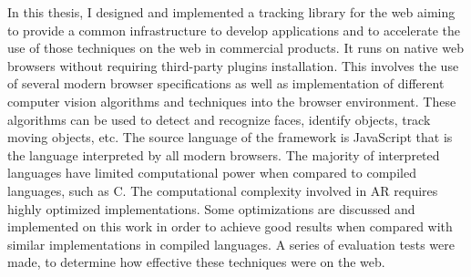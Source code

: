 In this thesis, I designed and implemented a tracking library for the web aiming to provide a common infrastructure to develop applications and to accelerate the use of those techniques on the web in commercial products.  It runs on native web browsers without requiring third-party plugins installation. This involves the use of several modern browser specifications as well as implementation of different computer vision algorithms and techniques into the browser environment. These algorithms can be used to detect and recognize faces, identify objects, track moving objects, etc.  The source language of the framework is JavaScript that is the language interpreted by all modern browsers. The majority of interpreted languages have limited computational power when compared to compiled languages, such as C. The computational complexity involved in AR requires highly optimized implementations. Some optimizations are discussed and implemented on this work in order to achieve good results when compared with similar implementations in compiled languages.  A series of evaluation tests were made, to determine how effective these techniques were on the web.


